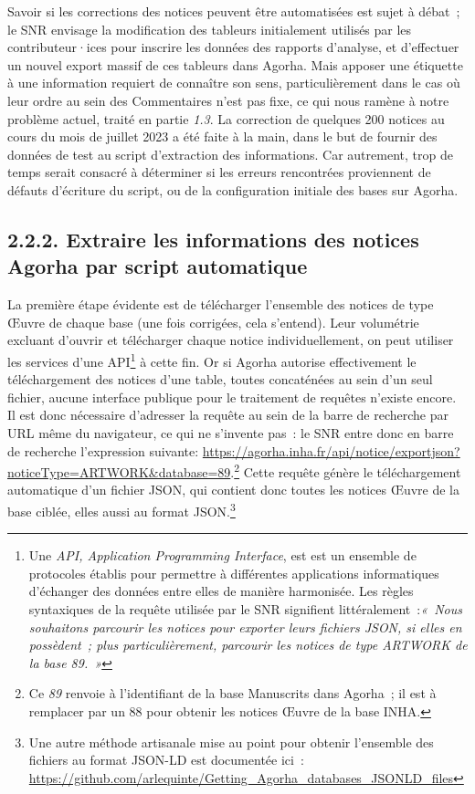 \documentclass[a4paper,12pt, twoside]{book}
\begin{document}
Savoir si les corrections des notices peuvent être automatisées est sujet à débat~; le SNR envisage la modification des tableurs initialement utilisés par les contributeur·ices pour inscrire les données des rapports d’analyse, et d’effectuer un nouvel export massif de ces tableurs dans Agorha. Mais apposer une étiquette à une information requiert de connaître son sens, particulièrement dans le cas où leur ordre au sein des \textsf{Commentaires} n’est pas fixe, ce qui nous ramène à notre problème actuel, traité en partie \emph{1.3}. La correction de quelques 200 notices au cours du mois de juillet 2023 a été faite à la main, dans le but de fournir des données de test au script d’extraction des informations. Car autrement, trop de temps serait consacré à déterminer si les erreurs rencontrées proviennent de défauts d’écriture du script, ou de la configuration initiale des bases sur Agorha.

\subsection*{2.2.2. Extraire les informations des notices Agorha par script automatique}

La première étape évidente est de télécharger l’ensemble des notices de type \textsf{Œuvre} de chaque base (une fois corrigées, cela s’entend). Leur volumétrie excluant d’ouvrir et télécharger chaque notice individuellement, on peut utiliser les services d’une API\footnote{Une \emph{API, Application Programming Interface}, est est un ensemble de protocoles établis pour permettre à différentes applications informatiques d’échanger des données entre elles de manière harmonisée. Les règles syntaxiques de la requête utilisée par le SNR signifient littéralement~:\textit{«~Nous souhaitons parcourir les notices pour exporter leurs fichiers JSON, si elles en possèdent~; plus particulièrement, parcourir les notices de type \textsf{ARTWORK} de la base 89.~»}} à cette fin. Or si Agorha autorise effectivement le téléchargement des notices d’une table, toutes concaténées au sein d’un seul fichier, aucune interface publique pour le traitement de requêtes n’existe encore. Il est donc nécessaire d’adresser la requête au sein de la barre de recherche par URL même du navigateur, ce qui ne s’invente pas~: le SNR entre donc en barre de recherche l’expression suivante: \url{https://agorha.inha.fr/api/notice/exportjson?noticeType=ARTWORK&database=89}.\footnote{Ce \textit{89} renvoie à l’identifiant de la base Manuscrits dans Agorha~; il est à remplacer par un 88 pour obtenir les notices \textsf{Œuvre} de la base INHA.} Cette requête génère le téléchargement automatique d’un fichier JSON, qui contient donc toutes les notices \textsf{Œuvre} de la base ciblée, elles aussi au format JSON.\footnote{Une autre méthode artisanale mise au point pour obtenir l’ensemble des fichiers au format JSON-LD est documentée ici~: \url{https://github.com/arlequinte/Getting_Agorha_databases_JSONLD_files}}
\end{document}
